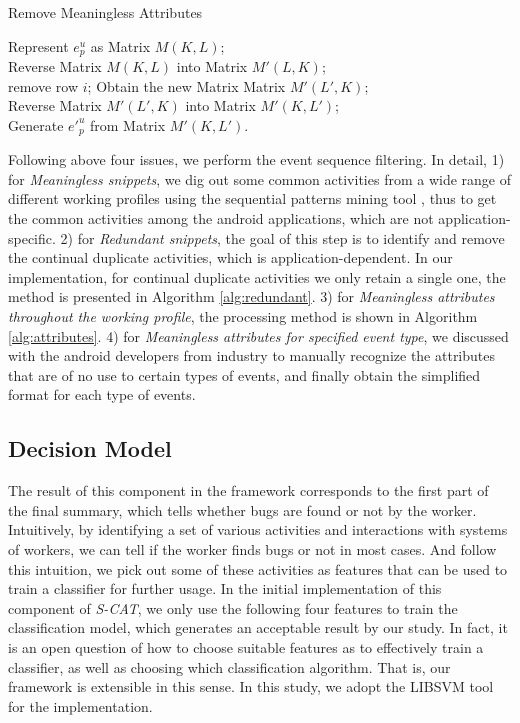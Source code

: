 \documentclass[10pt,conference]{IEEEtran}
\begin{document}
\begin{algorithm}[!htbp]
\small
\caption{Remove Meaningless Attributes}
\label{alg:attributes}
\BlankLine
\LinesNumbered
{}
Represent $e^{u}_p$ as Matrix $M(K,L)$;\\
Reverse Matrix $M(K,L)$ into Matrix $M'(L,K)$;\\
 {
{remove row $i$;}
}
Obtain the new Matrix Matrix $M'(L',K)$;\\
Reverse Matrix $M'(L',K)$ into Matrix $M'(K,L')$;\\
Generate $e'^{u}_p$ from Matrix $M'(K,L')$.\\
\end{algorithm}


Following above four issues, we perform the event sequence filtering. In detail, 
1) for \emph{Meaningless snippets}, we dig out some common activities from a wide range of different working profiles using the sequential
patterns mining tool \cite{fournier2014fast}, thus to get the common activities among the android applications, which are not application-specific. 
2) for \emph{Redundant snippets}, the goal of this step is to identify and remove the continual duplicate activities, which is application-dependent.
In our implementation, for continual duplicate activities we only retain a single one, the method is presented in Algorithm \ref{alg:redundant}.
3) for \emph{Meaningless attributes throughout the working profile}, the processing method is shown in Algorithm \ref{alg:attributes}. 
4) for \emph{Meaningless attributes for specified event type}, we discussed with the android developers from industry to manually recognize
the attributes that are of no use to certain types of events, and finally obtain the simplified format for each type of events.


\subsection{Decision Model}\label{decision}

The result of this component in the framework corresponds to the first part of the final summary, which tells whether
bugs are found or not by the worker. Intuitively, by identifying a set of various activities and interactions with systems of workers,
we can tell if the worker finds bugs or not in most cases. And follow this intuition, we pick out some of these activities as features that can
be used to train a classifier for further usage. In the initial implementation of this component of \emph{S-CAT}, we only use the following
four features to train the classification model, which generates an acceptable result by our study. In fact, it is an open question
of how to choose suitable features as to effectively train a classifier, as well as choosing which classification algorithm.  
That is, our framework is extensible in this sense. In this study, we adopt the LIBSVM \cite{chang2011libsvm} tool for the implementation.
\end{document}
